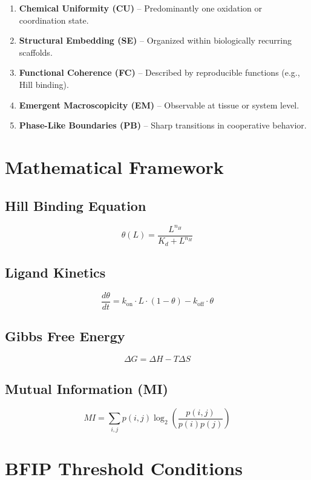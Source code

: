 \documentclass[11pt]{article}
\begin{document}
\begin{enumerate}
    \item \textbf{Chemical Uniformity (CU)} – Predominantly one oxidation or coordination state.
    \item \textbf{Structural Embedding (SE)} – Organized within biologically recurring scaffolds.
    \item \textbf{Functional Coherence (FC)} – Described by reproducible functions (e.g., Hill binding).
    \item \textbf{Emergent Macroscopicity (EM)} – Observable at tissue or system level.
    \item \textbf{Phase-Like Boundaries (PB)} – Sharp transitions in cooperative behavior.
\end{enumerate}

\section{Mathematical Framework}

\subsection{Hill Binding Equation}

\[
\theta(L) = \frac{L^{n_H}}{K_d + L^{n_H}}
\]

\subsection{Ligand Kinetics}

\[
\frac{d\theta}{dt} = k_{\text{on}} \cdot L \cdot (1 - \theta) - k_{\text{off}} \cdot \theta
\]

\subsection{Gibbs Free Energy}

\[
\Delta G = \Delta H - T \Delta S
\]

\subsection{Mutual Information (MI)}

\[
MI = \sum_{i,j} p(i,j) \log_2 \left( \frac{p(i,j)}{p(i)p(j)} \right)
\]

\section{BFIP Threshold Conditions}
\end{document}
